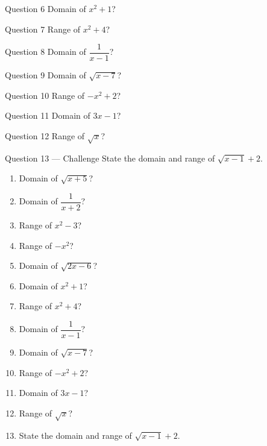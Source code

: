 \documentclass[11pt]{article}
\begin{document}
\begin{qbox}{Question 6}
Domain of $x^2+1$?\workspace{2.4cm}
\end{qbox}

\begin{qbox}{Question 7}
Range of $x^2+4$?\workspace{2.4cm}
\end{qbox}

\begin{qbox}{Question 8}
Domain of $\dfrac{1}{x-1}$?\workspace{2.4cm}
\end{qbox}

\begin{qbox}{Question 9}
Domain of $\sqrt{x-7}$?\workspace{2.4cm}
\end{qbox}

\begin{qbox}{Question 10}
Range of $-x^2+2$?\workspace{2.4cm}
\end{qbox}

\begin{qbox}{Question 11}
Domain of $3x-1$?\workspace{2.4cm}
\end{qbox}

\begin{qbox}{Question 12}
Range of $\sqrt{x}$?\workspace{2.4cm}
\end{qbox}

\begin{qbox}{Question 13 --- Challenge}
State the domain and range of $\sqrt{x-1}+2$.\workspace{2.6cm}
\end{qbox}

\clearpage
{}

\begin{recapbox}
\begin{multicols}{2}
\small
\begin{enumerate}[leftmargin=*,itemsep=3pt]
  \item Domain of $\sqrt{x+5}$?
  \item Domain of $\dfrac{1}{x+2}$?
  \item Range of $x^2-3$?
  \item Range of $-x^2$?
  \item Domain of $\sqrt{2x-6}$?
  \item Domain of $x^2+1$?
  \item Range of $x^2+4$?
  \item Domain of $\dfrac{1}{x-1}$?
  \item Domain of $\sqrt{x-7}$?
  \item Range of $-x^2+2$?
  \item Domain of $3x-1$?
  \item Range of $\sqrt{x}$?
  \item State the domain and range of $\sqrt{x-1}+2$.
\end{enumerate}
\end{multicols}
\end{recapbox}
\end{document}
